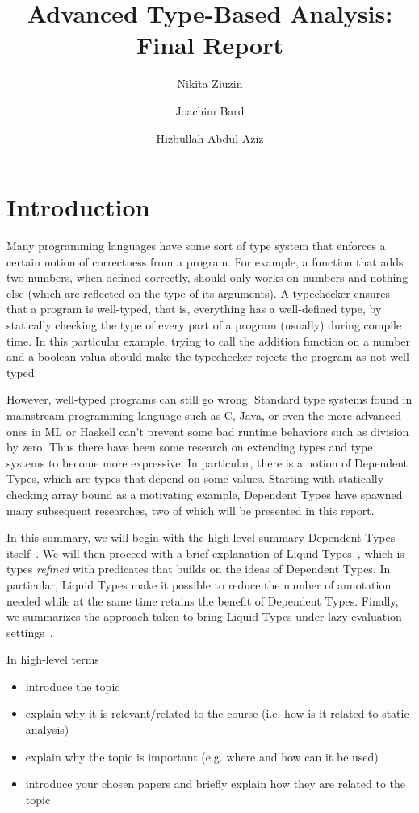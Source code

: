 \documentclass[a4paper,UKenglish]{lipics-v2016}
\title{Advanced Type-Based Analysis: Final Report}
\author[1]{Nikita Ziuzin}
\author[2]{Joachim Bard}
\author[3]{Hizbullah Abdul Aziz}
\affil[1]{\texttt{nzyuzin93@gmail.com}}
\affil[2]{\texttt{s9jobard@stud.uni-saarland.de}}
\affil[3]{\texttt{s8hijabb@stud.uni-saarland.de}}
\begin{document}
\maketitle


\section{Introduction}
\label{sec:intro}

  Many programming languages have some sort of type system that enforces a
  certain notion of correctness from a program.  For example, a function that
  adds two numbers, when defined correctly, should only works on numbers and
  nothing else (which are reflected on the type of its arguments).  A
  typechecker ensures that a program is well-typed, that is, everything has a
  well-defined type, by statically checking the type of every part of a program
  (usually) during compile time.  In this particular example, trying to call
  the addition function on a number and a boolean valua should make the
  typechecker rejects the program as not well-typed.

  However, well-typed programs can still go wrong.  Standard type systems found
  in mainstream programming language such as C, Java, or even the more advanced
  ones in ML or Haskell can't prevent some bad runtime behaviors such as
  division by zero.  Thus there have been some research on extending types and
  type systems to become more expressive.  In particular, there is a notion of
  Dependent Types, which are types that depend on some values.  Starting with
  statically checking array bound as a motivating example, Dependent Types
  have spawned many subsequent researches, two of which will be presented in
  this report.

  In this summary, we will begin with the high-level summary Dependent Types
  itself~\cite{Xi:1998:EAB}.  We will then proceed with a brief explanation of
  Liquid Types~\cite{Rondon:2008:LT}, which is types \emph{refined} with
  predicates that builds on the ideas of Dependent Types.  In particular,
  Liquid Types make it possible to reduce the number of annotation needed while
  at the same time retains the benefit of Dependent Types.  Finally, we
  summarizes the approach taken to bring Liquid Types under lazy evaluation
  settings~\cite{Vazou:ICFP:2014}.

  In high-level terms
  \begin{itemize}
    \item introduce the topic

    \item explain why it is relevant/related to the course (i.e. how is it related
    to static analysis)

    \item explain why the topic is important (e.g. where and how can it be used)

    \item introduce your chosen papers and briefly explain how they are related
    to the topic
  \end{itemize}
\end{document}
